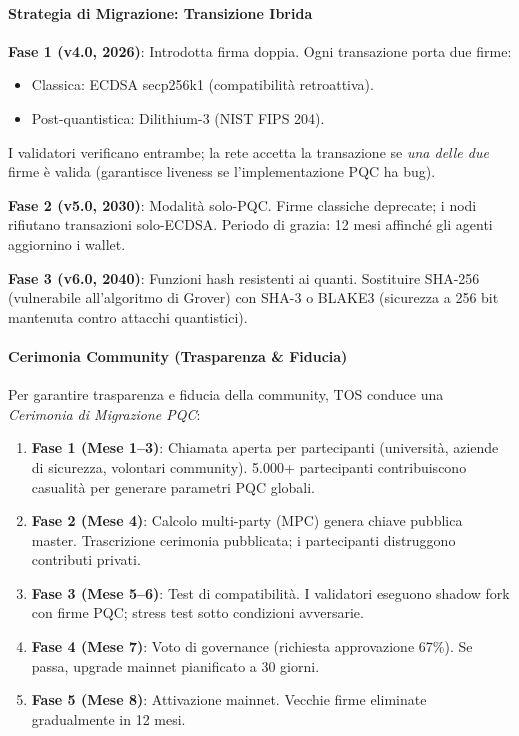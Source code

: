 \documentclass[11pt]{article}
\begin{document}
\paragraph{Strategia di Migrazione: Transizione Ibrida}
\textbf{Fase 1 (v4.0, 2026)}: Introdotta firma doppia. Ogni transazione porta due firme:
\begin{itemize}[noitemsep]
  \item Classica: ECDSA secp256k1 (compatibilità retroattiva).
  \item Post-quantistica: Dilithium-3 (NIST FIPS 204).
\end{itemize}
I validatori verificano entrambe; la rete accetta la transazione se \emph{una delle due} firme è valida (garantisce liveness se l'implementazione PQC ha bug).

\textbf{Fase 2 (v5.0, 2030)}: Modalità solo-PQC. Firme classiche deprecate; i nodi rifiutano transazioni solo-ECDSA. Periodo di grazia: 12 mesi affinché gli agenti aggiornino i wallet.

\textbf{Fase 3 (v6.0, 2040)}: Funzioni hash resistenti ai quanti. Sostituire SHA-256 (vulnerabile all'algoritmo di Grover) con SHA-3 o BLAKE3 (sicurezza a 256 bit mantenuta contro attacchi quantistici).

\paragraph{Cerimonia Community (Trasparenza \& Fiducia)}
Per garantire trasparenza e fiducia della community, TOS conduce una \emph{Cerimonia di Migrazione PQC}:
\begin{enumerate}[noitemsep]
  \item \textbf{Fase 1 (Mese 1--3)}: Chiamata aperta per partecipanti (università, aziende di sicurezza, volontari community). 5.000+ partecipanti contribuiscono casualità per generare parametri PQC globali.
  \item \textbf{Fase 2 (Mese 4)}: Calcolo multi-party (MPC) genera chiave pubblica master. Trascrizione cerimonia pubblicata; i partecipanti distruggono contributi privati.
  \item \textbf{Fase 3 (Mese 5--6)}: Test di compatibilità. I validatori eseguono shadow fork con firme PQC; stress test sotto condizioni avversarie.
  \item \textbf{Fase 4 (Mese 7)}: Voto di governance (richiesta approvazione 67\%). Se passa, upgrade mainnet pianificato a 30 giorni.
  \item \textbf{Fase 5 (Mese 8)}: Attivazione mainnet. Vecchie firme eliminate gradualmente in 12 mesi.
\end{enumerate}
\end{document}
